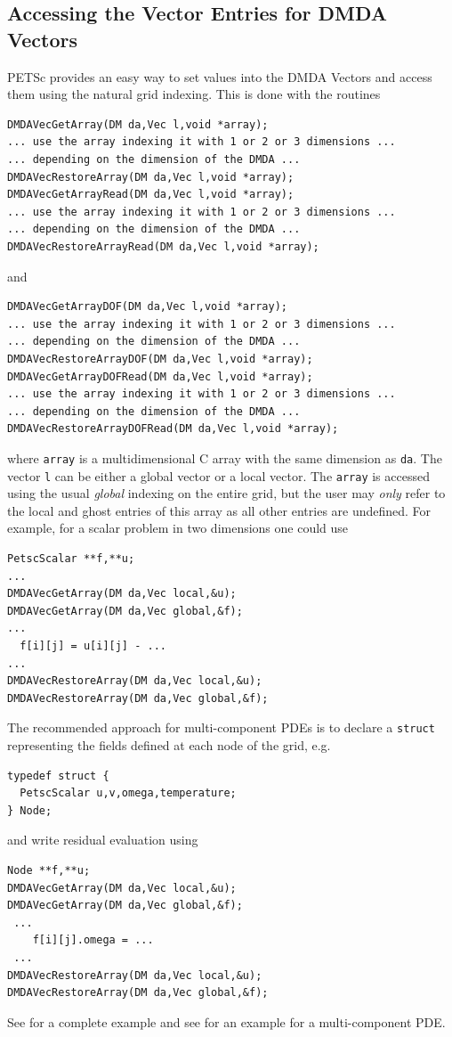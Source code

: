 \subsection{Accessing the Vector Entries for DMDA Vectors}
PETSc provides an easy way to set values into the DMDA Vectors and access them using
the natural grid indexing. This is done with the routines
\begin{lstlisting}
DMDAVecGetArray(DM da,Vec l,void *array);
... use the array indexing it with 1 or 2 or 3 dimensions ...
... depending on the dimension of the DMDA ...
DMDAVecRestoreArray(DM da,Vec l,void *array);
DMDAVecGetArrayRead(DM da,Vec l,void *array);
... use the array indexing it with 1 or 2 or 3 dimensions ...
... depending on the dimension of the DMDA ...
DMDAVecRestoreArrayRead(DM da,Vec l,void *array);
\end{lstlisting}
and
\begin{lstlisting}
DMDAVecGetArrayDOF(DM da,Vec l,void *array);
... use the array indexing it with 1 or 2 or 3 dimensions ...
... depending on the dimension of the DMDA ...
DMDAVecRestoreArrayDOF(DM da,Vec l,void *array);
DMDAVecGetArrayDOFRead(DM da,Vec l,void *array);
... use the array indexing it with 1 or 2 or 3 dimensions ...
... depending on the dimension of the DMDA ...
DMDAVecRestoreArrayDOFRead(DM da,Vec l,void *array);
\end{lstlisting}
where \lstinline{array} is a multidimensional C array with the same dimension as
\lstinline{da}. The vector \lstinline{l} can be either a global vector or a local vector.
The \lstinline{array} is accessed using the usual {\em global} indexing
on the entire grid, but the user may {\em only} refer to the local and ghost
entries of this array as all other entries are undefined. For example, for a
scalar problem in two dimensions one could use
\begin{lstlisting}
PetscScalar **f,**u;
...
DMDAVecGetArray(DM da,Vec local,&u);
DMDAVecGetArray(DM da,Vec global,&f);
...
  f[i][j] = u[i][j] - ...
...
DMDAVecRestoreArray(DM da,Vec local,&u);
DMDAVecRestoreArray(DM da,Vec global,&f);
\end{lstlisting}
The recommended approach for multi-component PDEs is to declare a \lstinline{struct} representing the fields defined at each node of the grid, e.g.
\begin{lstlisting}
typedef struct {
  PetscScalar u,v,omega,temperature;
} Node;
\end{lstlisting}
and write residual evaluation using
\begin{lstlisting}
Node **f,**u;
DMDAVecGetArray(DM da,Vec local,&u);
DMDAVecGetArray(DM da,Vec global,&f);
 ...
    f[i][j].omega = ...
 ...
DMDAVecRestoreArray(DM da,Vec local,&u);
DMDAVecRestoreArray(DM da,Vec global,&f);
\end{lstlisting}
See \href{https://www.mcs.anl.gov/petsc/petsc-current/src/snes/tutorials/ex5.c.html}{} for a
complete example and see \href{https://www.mcs.anl.gov/petsc/petsc-current/src/snes/tutorials/ex19.c.html}{} for an
example for a multi-component PDE.

